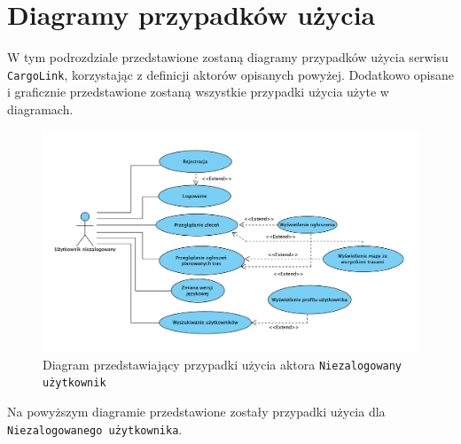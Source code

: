 \section{Diagramy przypadków użycia}
W tym podrozdziale przedstawione zostaną diagramy przypadków użycia serwisu \texttt{CargoLink}, korzystając z definicji aktorów opisanych powyżej. Dodatkowo opisane i graficznie przedstawione zostaną wszystkie przypadki użycia użyte w diagramach.
\begin{figure}[H]
	\centering
		\includegraphics[width=\linewidth]{rozdzial1/PU_niezalogowany_uzytkownik.png}
	\caption{Diagram przedstawiający przypadki użycia aktora \texttt{Niezalogowany użytkownik}}
	\label{Rys. fig:Diagram przedstawiający przypadki użycia aktora Niezalogowany użytkownik}
\end{figure}
Na powyższym diagramie przedstawione zostały przypadki użycia dla \texttt{Niezalogowanego użytkownika}. \\

